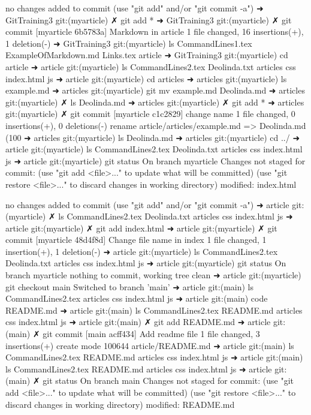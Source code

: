 no changes added to commit (use "git add" and/or "git commit -a")
➜  GitTraining3 git:(myarticle) ✗ git add *
➜  GitTraining3 git:(myarticle) ✗ git commit
[myarticle 6b5783a] Markdown in article
 1 file changed, 16 insertions(+), 1 deletion(-)
➜  GitTraining3 git:(myarticle) ls
CommandLines1.tex    ExampleOfMarkdown.md Links.tex            article
➜  GitTraining3 git:(myarticle) cd article 
➜  article git:(myarticle) ls
CommandLines2.tex Deolinda.txt      articles          css               index.html        js
➜  article git:(myarticle) cd articles 
➜  articles git:(myarticle) ls
example.md
➜  articles git:(myarticle) git mv example.md Deolinda.md
➜  articles git:(myarticle) ✗ ls
Deolinda.md
➜  articles git:(myarticle) ✗ git add * 
➜  articles git:(myarticle) ✗ git commit
[myarticle c1c2829] change name
 1 file changed, 0 insertions(+), 0 deletions(-)
 rename article/articles/{example.md => Deolinda.md} (100%
➜  articles git:(myarticle) ls
Deolinda.md
➜  articles git:(myarticle) cd ../
➜  article git:(myarticle) ls
CommandLines2.tex Deolinda.txt      articles          css               index.html        js
➜  article git:(myarticle) git status
On branch myarticle
Changes not staged for commit:
  (use "git add <file>..." to update what will be committed)
  (use "git restore <file>..." to discard changes in working directory)
	modified:   index.html

no changes added to commit (use "git add" and/or "git commit -a")
➜  article git:(myarticle) ✗ ls 
CommandLines2.tex Deolinda.txt      articles          css               index.html        js
➜  article git:(myarticle) ✗ git add index.html 
➜  article git:(myarticle) ✗ git commit
[myarticle 48d4f8d] Change file name in index
 1 file changed, 1 insertion(+), 1 deletion(-)
➜  article git:(myarticle) ls
CommandLines2.tex Deolinda.txt      articles          css               index.html        js
➜  article git:(myarticle) git status 
On branch myarticle
nothing to commit, working tree clean
➜  article git:(myarticle) git checkout main
Switched to branch 'main'
➜  article git:(main) ls
CommandLines2.tex articles          css               index.html        js
➜  article git:(main) code README.md 
➜  article git:(main) ls
CommandLines2.tex README.md         articles          css               index.html        js
➜  article git:(main) ✗ git add README.md 
➜  article git:(main) ✗ git commit
[main acff434] Add readme file
 1 file changed, 3 insertions(+)
 create mode 100644 article/README.md
➜  article git:(main) ls
CommandLines2.tex README.md         articles          css               index.html        js
➜  article git:(main) ls
CommandLines2.tex README.md         articles          css               index.html        js
➜  article git:(main) ✗ git status
On branch main
Changes not staged for commit:
  (use "git add <file>..." to update what will be committed)
  (use "git restore <file>..." to discard changes in working directory)
	modified:   README.md

